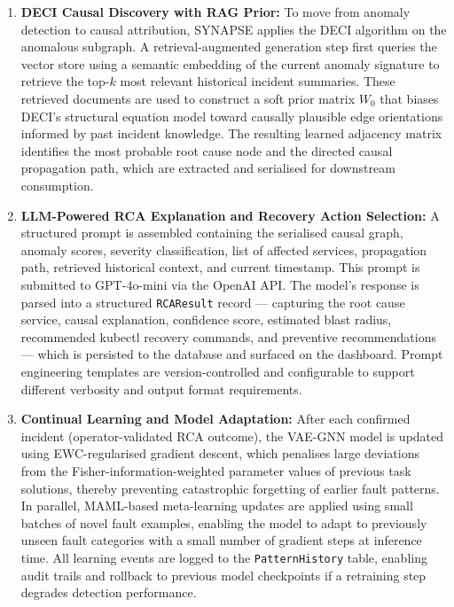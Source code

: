 \begin{enumerate}
    \item \textbf{DECI Causal Discovery with RAG Prior:}
    To move from anomaly detection to causal attribution, SYNAPSE applies the DECI algorithm on the anomalous subgraph. A retrieval-augmented generation step first queries the vector store using a semantic embedding of the current anomaly signature to retrieve the top-$k$ most relevant historical incident summaries. These retrieved documents are used to construct a soft prior matrix $W_0$ that biases DECI's structural equation model toward causally plausible edge orientations informed by past incident knowledge. The resulting learned adjacency matrix identifies the most probable root cause node and the directed causal propagation path, which are extracted and serialised for downstream consumption.\\

    \item \textbf{LLM-Powered RCA Explanation and Recovery Action Selection:}
    A structured prompt is assembled containing the serialised causal graph, anomaly scores, severity classification, list of affected services, propagation path, retrieved historical context, and current timestamp. This prompt is submitted to GPT-4o-mini via the OpenAI API. The model's response is parsed into a structured \texttt{RCAResult} record — capturing the root cause service, causal explanation, confidence score, estimated blast radius, recommended kubectl recovery commands, and preventive recommendations — which is persisted to the database and surfaced on the dashboard. Prompt engineering templates are version-controlled and configurable to support different verbosity and output format requirements.\\

    \item \textbf{Continual Learning and Model Adaptation:}
    After each confirmed incident (operator-validated RCA outcome), the VAE-GNN model is updated using EWC-regularised gradient descent, which penalises large deviations from the Fisher-information-weighted parameter values of previous task solutions, thereby preventing catastrophic forgetting of earlier fault patterns. In parallel, MAML-based meta-learning updates are applied using small batches of novel fault examples, enabling the model to adapt to previously unseen fault categories with a small number of gradient steps at inference time. All learning events are logged to the \texttt{PatternHistory} table, enabling audit trails and rollback to previous model checkpoints if a retraining step degrades detection performance.\\

\end{enumerate}

